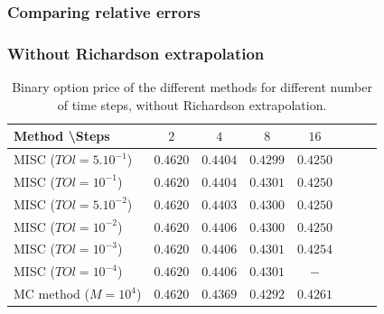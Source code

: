 \documentclass[11pt]{article}
\newcommand{\expt}[1]{\mathrm{E}\left[#1\right]}
\begin{document}
%	
\FloatBarrier
\subsubsection{Comparing relative errors}


\subsubsection*{Without Richardson extrapolation}




\begin{table}[h!]
	\centering
	\begin{tabular}{l*{6}{c}r}
		Method \textbackslash  Steps            & $2$ & $4$ & $8$ & $16$ &   \\
		\hline
		MISC ($TOl=5.10^{-1}$)  & $0.4620$ & $0.4404$ & $0.4299$ & $0.4250$  \\
		MISC ($TOl=10^{-1}$)  & $0.4620$ & $0.4404$ & $0.4301$ & $0.4250$  \\
		MISC ($TOl=5.10^{-2}$)  & $0.4620$ & $0.4403$ & $0.4300$ & $0.4250$  \\
		MISC ($TOl=10^{-2}$)  & $0.4620$ & $0.4406$ &  $0.4300$ & $0.4250$  \\
		MISC ($TOl=10^{-3}$)  & $0.4620$ & $0.4406$ & $0.4301$  & $0.4254$  \\
		MISC ($TOl=10^{-4}$)  & $0.4620$ & $0.4406$ &  $0.4301$ & $-$  \\
		\hline
		MC method ($M=10^{4}$)   & $  0.4620$ & $    0.4369
		$  & $      0.4292$ & $  
		0.4261$ \\	
		\hline
	\end{tabular}
	\caption{Binary option price of the different methods for different number of time steps, without Richardson extrapolation.}
	\label{table: Binary option price of the different methods for different number of time steps, without Richardson extrapolation.}
\end{table}
\end{document}
